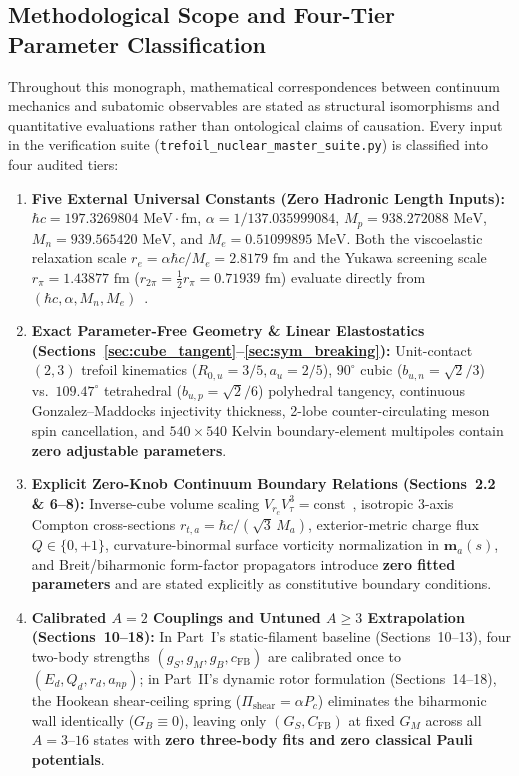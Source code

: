 \documentclass[11pt, a4paper]{article}
\begin{document}
\subsection{Methodological Scope and Four-Tier Parameter Classification}
Throughout this monograph, mathematical correspondences between continuum mechanics and subatomic observables are stated as structural isomorphisms and quantitative evaluations rather than ontological claims of causation. Every input in the verification suite (\texttt{trefoil\_nuclear\_master\_suite.py}) is classified into four audited tiers:
\begin{enumerate}[leftmargin=1.8em, itemsep=2pt]
    \item \textbf{Five External Universal Constants (Zero Hadronic Length Inputs):} $\hbar c = 197.3269804\text{ MeV}\cdot\text{fm}$, $\alpha = 1/137.035999084$, $M_p = 938.272088\text{ MeV}$, $M_n = 939.565420\text{ MeV}$, and $M_e = 0.51099895\text{ MeV}$. Both the viscoelastic relaxation scale $r_e = \alpha\hbar c/M_e = 2.8179\text{ fm}$ and the Yukawa screening scale $r_\pi = 1.43877\text{ fm}$ ($r_{2\pi} = \frac{1}{2}r_\pi = 0.71939\text{ fm}$) evaluate directly from $(\hbar c, \alpha, M_n, M_e)$~\cite{bairmosheh2026}.
    \item \textbf{Exact Parameter-Free Geometry \& Linear Elastostatics (Sections~\ref{sec:cube_tangent}--\ref{sec:sym_breaking}):} Unit-contact $(2,3)$ trefoil kinematics ($R_{0,u} = 3/5, a_u = 2/5$), $90^\circ$ cubic ($b_{u,n} = \sqrt{2}/3$) vs.\ $109.47^\circ$ tetrahedral ($b_{u,p} = \sqrt{2}/6$) polyhedral tangency, continuous Gonzalez--Maddocks injectivity thickness, 2-lobe counter-circulating meson spin cancellation, and $540 \times 540$ Kelvin boundary-element multipoles contain \textbf{zero adjustable parameters}.
    \item \textbf{Explicit Zero-Knob Continuum Boundary Relations (Sections~2.2 \& 6--8):} Inverse-cube volume scaling $V_{r_c}V_\tau^3 = \text{const}$~\cite{bairmosheh2026}, isotropic 3-axis Compton cross-sections $r_{t,a} = \hbar c/(\sqrt{3}\,M_a)$, exterior-metric charge flux $Q \in \{0, +1\}$, curvature-binormal surface vorticity normalization in $\mathbf{m}_a(s)$, and Breit/biharmonic form-factor propagators introduce \textbf{zero fitted parameters} and are stated explicitly as constitutive boundary conditions.
    \item \textbf{Calibrated $A = 2$ Couplings and Untuned $A \ge 3$ Extrapolation (Sections~10--18):} In Part~I's static-filament baseline (Sections~10--13), four two-body strengths $(g_S, g_M, g_B, c_{\mathrm{FB}})$ are calibrated once to $(E_d, Q_d, r_d, a_{np})$; in Part~II's dynamic rotor formulation (Sections~14--18), the Hookean shear-ceiling spring ($\Pi_{\mathrm{shear}} = \alpha P_c$) eliminates the biharmonic wall identically ($G_B \equiv 0$), leaving only $(G_S, C_{\mathrm{FB}})$ at fixed $G_M$ across all $A = 3\text{--}16$ states with \textbf{zero three-body fits and zero classical Pauli potentials}.
\end{enumerate}
\end{document}
